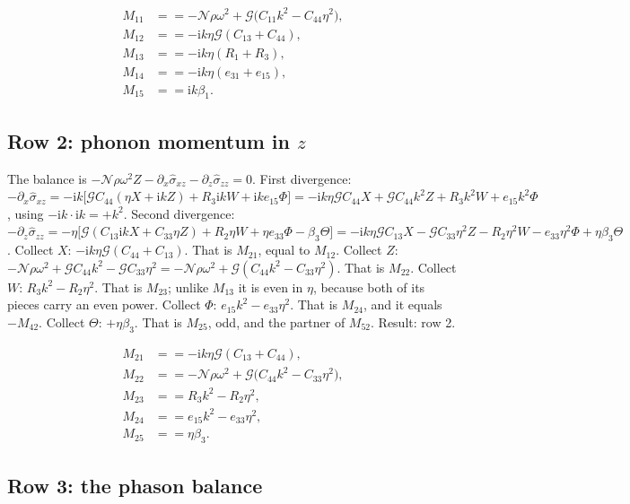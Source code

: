 \documentclass[11pt]{article}
\makeatletter
\newif\ifshowworked
\newenvironment{worked}{%
  \ifshowworked\par\smallskip\noindent\textit{Working.}\par\smallskip\else
  \setbox\z@\vbox\bgroup\fi}{\ifshowworked\par\smallskip\else\egroup\fi}
\newcommand{\ii}{\mathrm{i}}
\newcommand{\Ncal}{\mathcal{N}}
\newcommand{\Gcal}{\mathcal{G}}
\makeatother
\begin{document}
\begin{align}
M_{11}&==-\Ncal\rho\omega^2+\Gcal\bigl(C_{11}k^2-C_{44}\eta^2\bigr), \\
M_{12}&==-\ii k\eta\Gcal(C_{13}+C_{44}), \\
M_{13}&==-\ii k\eta(R_1+R_3), \\
M_{14}&==-\ii k\eta(e_{31}+e_{15}), \\
M_{15}&==\ii k\beta_1 .
\end{align}

\subsection*{Row 2: phonon momentum in $z$}

\begin{worked}
The balance is $-\Ncal\rho\omega^2Z-\partial_x\hat\sigma_{xz}-\partial_z\hat\sigma_{zz}=0$.
First divergence: $-\partial_x\hat\sigma_{xz}
=-\ii k\bigl[\Gcal C_{44}(\eta X+\ii kZ)+R_3\ii kW+\ii ke_{15}\Phi\bigr]
=-\ii k\eta\Gcal C_{44}X+\Gcal C_{44}k^2Z+R_3k^2W+e_{15}k^2\Phi$, using $-\ii k\cdot\ii k=+k^2$.
Second divergence: $-\partial_z\hat\sigma_{zz}
=-\eta\bigl[\Gcal(C_{13}\ii kX+C_{33}\eta Z)+R_2\eta W+\eta e_{33}\Phi-\beta_3\Theta\bigr]
=-\ii k\eta\Gcal C_{13}X-\Gcal C_{33}\eta^2Z-R_2\eta^2W-e_{33}\eta^2\Phi+\eta\beta_3\Theta$.
Collect $X$: $-\ii k\eta\Gcal(C_{44}+C_{13})$. That is $M_{21}$, equal to $M_{12}$.
Collect $Z$: $-\Ncal\rho\omega^2+\Gcal C_{44}k^2-\Gcal C_{33}\eta^2
=-\Ncal\rho\omega^2+\Gcal(C_{44}k^2-C_{33}\eta^2)$. That is $M_{22}$.
Collect $W$: $R_3k^2-R_2\eta^2$. That is $M_{23}$; unlike $M_{13}$ it is even in $\eta$, because both of
its pieces carry an even power.
Collect $\Phi$: $e_{15}k^2-e_{33}\eta^2$. That is $M_{24}$, and it equals $-M_{42}$.
Collect $\Theta$: $+\eta\beta_3$. That is $M_{25}$, odd, and the partner of $M_{52}$.
Result: row 2.
\end{worked}

\begin{align}
M_{21}&==-\ii k\eta\Gcal(C_{13}+C_{44}), \\
M_{22}&==-\Ncal\rho\omega^2+\Gcal\bigl(C_{44}k^2-C_{33}\eta^2\bigr), \\
M_{23}&==R_3k^2-R_2\eta^2, \\
M_{24}&==e_{15}k^2-e_{33}\eta^2, \\
M_{25}&==\eta\beta_3 .
\end{align}

\subsection*{Row 3: the phason balance}
\end{document}
